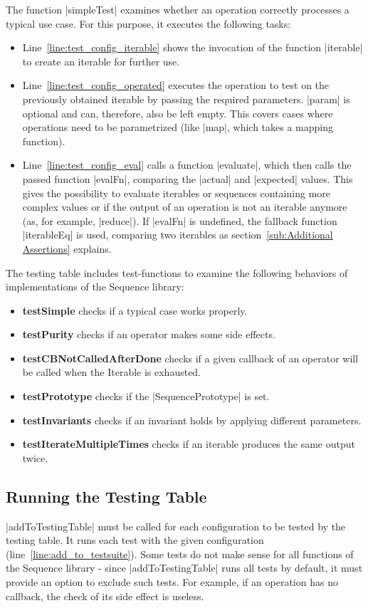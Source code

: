 The function |simpleTest| examines whether an operation correctly processes a typical use case.
For this purpose, it executes the following tasks: 
\begin{itemize}
  \item{Line~\ref{line:test_config_iterable} shows the invocation of the
      function |iterable| to create an iterable for further use.}
  \item{Line~\ref{line:test_config_operated} executes the operation to test on
      the previously obtained iterable by passing the required parameters.
      |param| is optional and can, therefore, also be left empty. This covers
      cases where operations need to be parametrized (like |map|, which takes a
      mapping function).}
  \item{Line~\ref{line:test_config_eval} calls a function |evaluate|, which
      then calls the passed function |evalFn|, comparing the |actual| and
      |expected| values. This gives the possibility to evaluate iterables or
      sequences containing more complex values or if the output of an operation
      is not an iterable anymore (as, for example, |reduce|). If |evalFn| is
    undefined, the fallback function |iterableEq| is used, comparing two
  iterables as section~\ref{sub:Additional Assertions} explains.} 
\end{itemize}

The testing table includes test-functions to examine the following behaviors of
implementations of the Sequence library:

\begin{itemize}
  \item{\textbf{testSimple} checks if a typical case works properly.}
  \item{\textbf{testPurity} checks if an operator makes some side effects.}
  \item{\textbf{testCBNotCalledAfterDone} checks if a given callback of an
    operator will be called when the Iterable is exhausted.}
  \item{\textbf{testPrototype} checks if the |SequencePrototype| is set.}
  \item{\textbf{testInvariants} checks if an invariant holds by applying different parameters.}
  \item{\textbf{testIterateMultipleTimes} checks if an iterable produces the same output twice.}
\end{itemize}

\subsection{Running the Testing Table}
\label{sub:Running the Testing Table}
|addToTestingTable| must be called for each configuration to be tested by the
testing table. It runs each test with the given configuration
(line~\ref{line:add_to_testsuite}). Some tests do not make sense for all
functions of the Sequence library - since |addToTestingTable| runs all tests by
default, it must provide an option to exclude such tests. For
example, if an operation has no callback, the check of its side effect is
useless.

